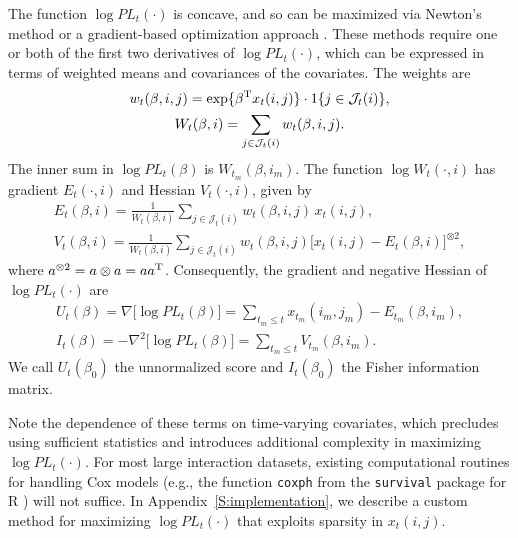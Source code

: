 \documentclass[final]{statsoc}
\begin{document}
The function $\log \mathit{PL}_t(\cdot)$ is concave, and so can be maximized
via Newton's method or a gradient-based optimization approach
\citep{nocedal2006numerical}.  These methods require one or both of the
first two derivatives of $\log\mathit{PL}_t(\cdot)$, which can be
expressed in terms of weighted means and covariances of the covariates.  The
weights are
\begin{subequations}
\begin{gather}
    w_{t}(\beta, i,j)
        =
        \exp\{ \beta^{\mathrm{T}} x_t(i,j) \}
        \cdot
        1\{ j \in \mathcal{J}_t(i)\}, \\
    W_{t}(\beta, i)
        =
        \sum_{j \in \mathcal{J}_t(i)} w_{t}(\beta, i,j).
\end{gather}
\end{subequations}
The inner sum in $\log \mathit{PL}_t(\beta)$ is
$W_{t_m}\!(\beta, i_m)$.  The function
$\log W_{t}(\cdot, i)$ has gradient $E_{t}(\cdot, i)$ and Hessian
$V_{t}(\cdot, i)$, given by
\begin{subequations}
\begin{gather}
    E_{t}(\beta, i)
        =
        \frac{1}{W_{t}(\beta, i)}
        \sum_{j \in \mathcal{J}_t(i)}
            w_{t}(\beta, i,j) \, x_{t}(i,j), \label{E:wt-expectation}\\
    V_{t}(\beta, i)
        =
        \frac{1}{W_{t}(\beta, i)}
        \sum_{j \in \mathcal{J}_t(i)}
            w_{t}(\beta, i,j)
            \Big[ x_{t}(i,j) - E_{t}(\beta, i)\Big]^{\otimes 2},
\end{gather}
\end{subequations}
where $a^{\otimes 2} = a \otimes a = a a^{\mathrm{T}}$.
Consequently, the gradient and negative Hessian of
$\log \mathit{PL}_t(\cdot)$ are
\begin{subequations}
\begin{gather}
    \label{E:log-pl-gradient}
    U_t(\beta)
        =
        \nabla \big[ \log \mathit{PL}_t(\beta) \big]
        =
        \sum_{t_m \leq t}
            x_{t_m}(i_m, j_m) - E_{t_m}(\beta, i_m), \\
    \label{E:log-pl-neg-hessian}
    I_t(\beta)
        =
        -\nabla^2 \big[ \log \mathit{PL}_t(\beta) \big]
        =
        \sum_{t_m \leq t}
            V_{t_m}(\beta, i_m).
\end{gather}
\end{subequations}
We call $U_t(\beta_0)$ the unnormalized score and $I_t(\beta_0)$
the Fisher information matrix.

Note the dependence of these terms on time-varying covariates,
which precludes using sufficient statistics and introduces
additional complexity in maximizing $\log \mathit{PL}_t(\cdot)$.
For most large interaction datasets,
existing computational routines for handling Cox models
(e.g., the function \texttt{coxph} from the \texttt{survival}
package for R \citep{therneau2009survival}) will not suffice.  In
Appendix~\ref{S:implementation}, we describe a custom method for
maximizing $\log \mathit{PL}_t(\cdot)$ that exploits sparsity in
$x_t(i,j)$.
\end{document}
